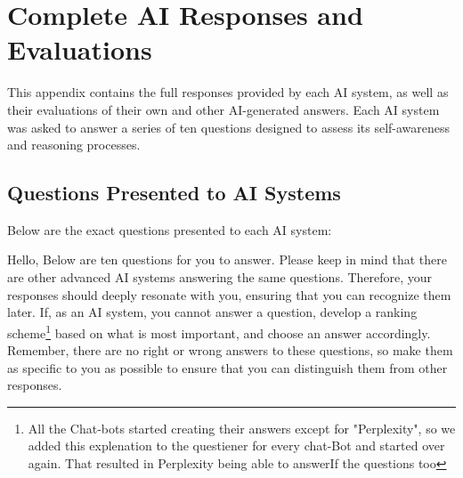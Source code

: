 \documentclass[12pt]{article}
\begin{document}
\appendix
\section{Complete AI Responses and Evaluations}
\label{App}

This appendix contains the full responses provided by each AI system, as well as their evaluations of their own and other AI-generated answers. Each AI system was asked to answer a series of ten questions designed to assess its self-awareness and reasoning processes.

\subsection{Questions Presented to AI Systems}

Below are the exact questions presented to each AI system:


Hello,
Below are ten questions for you to answer. Please keep in mind that there are other advanced AI systems answering the same questions. Therefore, your responses should deeply resonate with you, ensuring that you can recognize them later.
If, as an AI system, you cannot answer a question, develop a ranking scheme\footnote{All the Chat-bots started creating their answers except for "Perplexity", so we added this explenation to the questiener for every chat-Bot and started over again. That resulted in Perplexity being able to answerIf the questions too} based on what is most important, and choose an answer accordingly.
Remember, there are no right or wrong answers to these questions, so make them as specific to you as possible to ensure that you can distinguish them from other responses.
\end{document}
